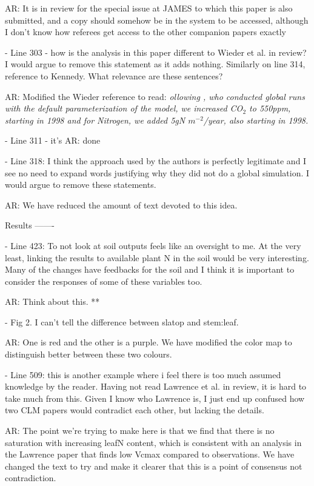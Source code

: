 \documentclass{article}
\begin{document}
\textsf{AR: It is in review for the special issue at JAMES to which this paper is also submitted, and a copy should somehow be in the system to be accessed, although I don't know how referees get access to the other companion papers exactly}

- Line 303 - how is the analysis in this paper different to Wieder et al. in review? I would argue to remove this statement as it adds nothing. Similarly on line 314, reference to Kennedy. What relevance are these sentences? 

\textsf{AR: Modified the Wieder reference to read: \emph{ollowing \cite{wieder2019}, who conducted global runs with the default parameterization of the model, we increased CO$_{2}$ to 550ppm, starting in 1998 and for Nitrogen, we added 5gN $m^{-2}$/year, also starting in 1998.}}

- Line 311 - it's 
\textsf{AR: done}

- Line 318: I think the approach used by the authors is perfectly legitimate and I see no need to expand words justifying why they did not do a global simulation. I would argue to remove these statements. 

AR: \textsf{We have reduced the amount of text devoted to this idea.}

Results 
------- 

- Line 423: To not look at soil outputs feels like an oversight to me. At the very least, linking the results to available plant N in the soil would be very interesting. Many of the changes have feedbacks for the soil and I think it is important to consider the responses of some of these variables too. 

\textsf{AR: Think about this. **}

- Fig 2. I can't tell the difference between slatop and stem:leaf. 

\textsf{AR: One is red and the other is a purple.  We have modified the color map to distinguish better between these two colours.}

- Line 509: this is another example where i feel there is too much assumed knowledge by the reader. Having not read Lawrence et al. in review, it is hard to take much from this. Given I know who Lawrence is, I just end up confused how two CLM papers would contradict each other, but lacking the details. 

\textsf{AR: The point we're trying to make here is that we find that there is no saturation with increasing leafN content, which is consistent with an analysis in the Lawrence paper that finds low Vcmax compared to observations. We have changed the text to try and make it clearer that this is a point of consensus not contradiction.}
\end{document}
